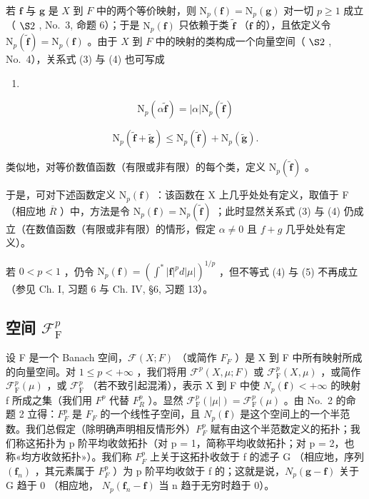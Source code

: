若 \(\mathbf{f}\) 与 \(\mathbf{g}\) 是 \(X\) 到 \(F\) 中的两个等价映射，则 \(\mathrm{N}_p(\mathbf{f}) = \mathrm{N}_p(\mathbf{g})\) 对一切 \(p \geqslant 1\) 成立（ \(\S 2\) , No.~3, 命题 6）；于是 \(\mathrm{N}_p(\mathbf{f})\) 只依赖于类 \(\widetilde{\mathbf{f}}\) （\(\mathbf{f}\) 的），且依定义令 \(\mathrm{N}_p(\widetilde{\mathbf{f}}) = \mathrm{N}_p(\mathbf{f})\) 。由于 \(X\) 到 \(F\) 中的映射的类构成一个向量空间（ \(\S 2\) , No.~4），关系式 (3) 与 (4) 也可写成

\begin{enumerate}
\def\labelenumi{(\arabic{enumi})}
\setcounter{enumi}{5}
\tightlist
\item
\end{enumerate}

\[
\mathrm{N} _ {p} (\alpha \widetilde {\mathbf {f}}) = | \alpha | \mathrm{N} _ {p} (\widetilde {\mathbf {f}})\tag{7}
\]

\[
\mathrm{N} _ {p} (\widetilde {\mathbf {f}} + \widetilde {\mathbf {g}}) \leqslant \mathrm{N} _ {p} (\widetilde {\mathbf {f}}) + \mathrm{N} _ {p} (\widetilde {\mathbf {g}}).
\]

类似地，对等价数值函数（有限或非有限）的每个类，定义 \(\mathrm{N}_{p}(\tilde{\mathbf{f}})\) 。

于是，可对下述函数定义 \(\mathrm{N}_{p}(\mathbf{f})\) ：该函数在 X 上几乎处处有定义，取值于 F （相应地 \(\overline{R}\) ）中，方法是令 \(\mathrm{N}_{p}(\mathbf{f})=\mathrm{N}_{p}(\widetilde{\mathbf{f}})\) ；此时显然关系式 (3) 与 (4) 仍成立（在数值函数（有限或非有限）的情形，假定 \(\alpha\neq0\) 且 \(f+g\) 几乎处处有定义）。

若 \(0 < p < 1\) ，仍令 \(\mathrm{N}_p(\mathbf{f}) = (\int^* |\mathbf{f}|^p d|\mu|)^{1/p}\) ，但不等式 (4) 与 (5) 不再成立（参见 Ch. I, 习题 6 与 Ch. IV, §6, 习题 13）。

\subsection{\texorpdfstring{空间 \(\mathcal{F}_{\mathrm{F}}^{p}\)}{空间 F sub F to the p}}

设 F 是一个 Banach 空间，\(\mathcal{F}(X;F)\) （或简作 \(F_{F}\) ）是 X 到 F 中所有映射所成的向量空间。对 \(1 \leqslant p < +\infty\) ，我们将用 \(\mathcal{F}^{p}(X,\mu;F)\) 或 \(\mathcal{F}_{\mathrm{F}}^{p}(X,\mu)\) ，或简作 \(\mathcal{F}_{\mathrm{F}}^{p}(\mu)\) ，或 \(\mathcal{F}_{\mathrm{F}}^{p}\) （若不致引起混淆），表示 X 到 F 中使 \(N_{p}(\mathbf{f}) < +\infty\) 的映射 f 所成之集（我们用 \(F^{p}\) 代替 \(F_{R}^{p}\) ）。显然 \(\mathcal{F}_{\mathrm{F}}^{p}(|\mu|) = \mathcal{F}_{\mathrm{F}}^{p}(\mu)\) 。由 No.~2 的命题 2 立得：\(F_{F}^{p}\) 是 \(F_{F}\) 的一个线性子空间，且 \(N_{p}(\mathbf{f})\) 是这个空间上的一个半范数。我们总假定（除明确声明相反情形外）\(F_{F}^{p}\) 赋有由这个半范数定义的拓扑；我们称这拓扑为 p 阶平均收敛拓扑（对 p = 1，简称平均收敛拓扑；对 p = 2，也称«均方收敛拓扑»）。我们称 \(F_{F}^{p}\) 上关于这拓扑收敛于 f 的滤子 G （相应地，序列 \((\mathbf{f}_{n})\) ，其元素属于 \(F_{F}^{p}\) ）为 p 阶平均收敛于 f 的；这就是说，\(N_{p}(\mathbf{g}-\mathbf{f})\) 关于 G 趋于 0 （相应地， \(N_{p}(\mathbf{f}_{n}-\mathbf{f})\) 当 n 趋于无穷时趋于 0）。

